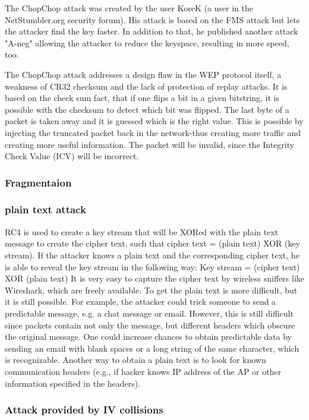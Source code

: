 \documentclass[a4paper,12pt,pagesize,headsepline,bibtotoc,titlepage]{scrartcl}
\begin{document}
The ChopChop attack was created by the user KoreK (a user in the NetStumbler.org security forum). His attack is based on the FMS attack but lets the attacker find the key faster. In addition to that, he published another attack "A-neg" allowing the attacker to reduce the keyspace, resulting in more speed, too.

The ChopChop attack addresses a design flaw in the WEP protocol itself, a weakness of CR32 checksum and the lack of protection of replay attacks.
It is based on the check sum fact, that if one flips a bit in a given bitstring, it is possible with the checksum to detect which bit was flipped. 
The last byte of a packet is taken away and it is guessed which is the right value.
This is possible by injecting the truncated packet back in the network-thus creating more traffic and creating more useful information. The packet will be invalid, since the Integrity Check Value (ICV) will be incorrect.

\subsubsection{Fragmentaion }

\subsubsection{plain text attack}

RC4 is used to create a key stream that will be XORed with the plain text message to create the cipher text, such that
cipher text = (plain text) XOR (key stream).
If the attacker knows a plain text and the corresponding cipher text, he is able to reveal the key stream in the following way: 
 Key stream = (cipher text) XOR (plain text)
It is very easy to capture the cipher text by wireless sniffers like Wireshark, which are freely available.
To get the plain text is more difficult, but it is still possible. For example, the attacker could trick someone to send a predictable message, e.g. a chat message or email.
However, this is still difficult since packets contain not only the message, but different headers which obscure the original message.
One could increase chances to obtain predictable data by sending an
email with blank spaces or a long string of the same character, which is recognizable. 
Another way to obtain a plain text is to look for known
communication headers (e.g., if hacker knows IP address of the
AP or other information specified in the headers).

\subsubsection{Attack provided by IV collisions}
\end{document}
